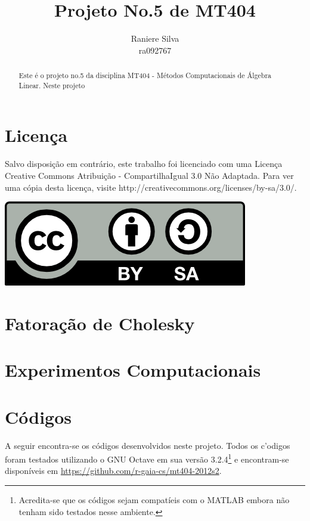 \documentclass[12pt,a4paper]{article}
\begin{document}
\title{Projeto No.5 de MT404}
\author{Raniere Silva \\ ra092767}
\maketitle
\begin{abstract}
    Este \'{e} o projeto no.5 da disciplina MT404 - M\'{e}todos Computacionais
    de \'{A}lgebra Linear. Neste projeto 
\end{abstract}
\tableofcontents
\lstlistoflistings
\section*{Licen\c{c}a}
Salvo disposi\c{c}\~{a}o em contr\'{a}rio, este trabalho foi licenciado com uma
Licen\c{c}a Creative Commons Atribui\c{c}\~{a}o - CompartilhaIgual 3.0 N\~{a}o
Adaptada. Para ver uma c\'{o}pia desta licen\c{c}a, visite
http://creativecommons.org/licenses/by-sa/3.0/.
\begin{center}
    \includegraphics{../figuras/cc-by-sa.png}
\end{center}
\newpage
\section{Fatora\c{c}\~{a}o de Cholesky}

\section{Experimentos Computacionais}

\section{C\'{o}digos}
A seguir encontra-se os c\'{o}digos desenvolvidos neste projeto. Todos os c'{o}digos
foram testados utilizando o GNU Octave em sua vers\~{a}o
3.2.4\footnote{Acredita-se que os c\'{o}digos sejam compat\'{i}eis com o MATLAB
embora n\~{a}o tenham sido testados nesse ambiente.} e encontram-se
dispon\'{i}veis em \url{https://github.com/r-gaia-cs/mt404-2012s2}.

\end{document}
